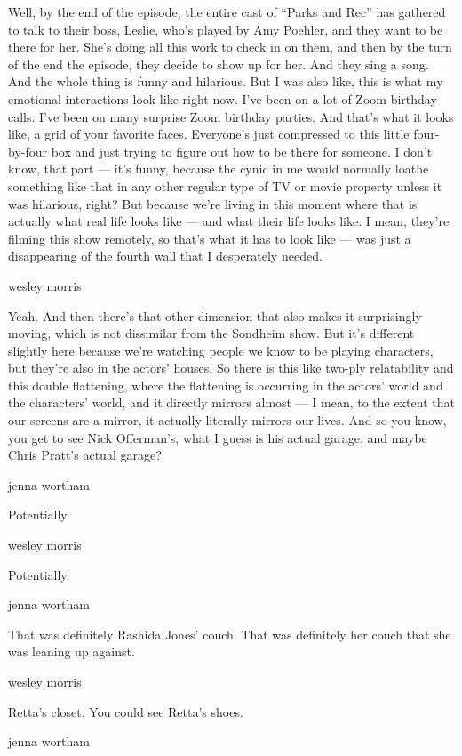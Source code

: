 Well, by the end of the episode, the entire cast of ``Parks and Rec''
has gathered to talk to their boss, Leslie, who's played by Amy Poehler,
and they want to be there for her. She's doing all this work to check in
on them, and then by the turn of the end the episode, they decide to
show up for her. And they sing a song. And the whole thing is funny and
hilarious. But I was also like, this is what my emotional interactions
look like right now. I've been on a lot of Zoom birthday calls. I've
been on many surprise Zoom birthday parties. And that's what it looks
like, a grid of your favorite faces. Everyone's just compressed to this
little four-by-four box and just trying to figure out how to be there
for someone. I don't know, that part --- it's funny, because the cynic
in me would normally loathe something like that in any other regular
type of TV or movie property unless it was hilarious, right? But because
we're living in this moment where that is actually what real life looks
like --- and what their life looks like. I mean, they're filming this
show remotely, so that's what it has to look like --- was just a
disappearing of the fourth wall that I desperately needed.

wesley morris

Yeah. And then there's that other dimension that also makes it
surprisingly moving, which is not dissimilar from the Sondheim show. But
it's different slightly here because we're watching people we know to be
playing characters, but they're also in the actors' houses. So there is
this like two-ply relatability and this double flattening, where the
flattening is occurring in the actors' world and the characters' world,
and it directly mirrors almost --- I mean, to the extent that our
screens are a mirror, it actually literally mirrors our lives. And so
you know, you get to see Nick Offerman's, what I guess is his actual
garage, and maybe Chris Pratt's actual garage?

jenna wortham

Potentially.

wesley morris

Potentially.

jenna wortham

That was definitely Rashida Jones' couch. That was definitely her couch
that she was leaning up against.

wesley morris

Retta's closet. You could see Retta's shoes.

jenna wortham


